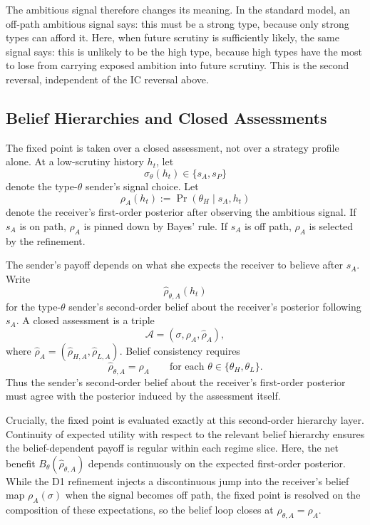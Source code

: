 The ambitious signal therefore changes its meaning. In the standard model, an off-path ambitious signal says: this must be a strong type, because only strong types can afford it. Here, when future scrutiny is sufficiently likely, the same signal says: this is unlikely to be the high type, because high types have the most to lose from carrying exposed ambition into future scrutiny. This is the second reversal, independent of the IC reversal above.

\subsection{Belief Hierarchies and Closed Assessments}
\label{subsec:belief-loop-hierarchy}

The fixed point is taken over a closed assessment, not over a strategy profile alone. At a low-scrutiny history \(h_t\), let
\[
\sigma_\theta(h_t)\in\{s_A,s_P\}
\]
denote the type-\(\theta\) sender's signal choice. Let
\[
\rho_A(h_t):=\Pr(\theta_H\mid s_A,h_t)
\]
denote the receiver's first-order posterior after observing the ambitious signal. If \(s_A\) is on path, \(\rho_A\) is pinned down by Bayes' rule. If \(s_A\) is off path, \(\rho_A\) is selected by the refinement.

The sender's payoff depends on what she expects the receiver to believe after \(s_A\). Write
\[
\widehat \rho_{\theta,A}(h_t)
\]
for the type-\(\theta\) sender's second-order belief about the receiver's posterior following \(s_A\). A closed assessment is a triple
\[
\mathcal A=(\sigma,\rho_A,\widehat \rho_A),
\]
where \(\widehat \rho_A=(\widehat\rho_{H,A},\widehat\rho_{L,A})\). Belief consistency requires
\[
\widehat\rho_{\theta,A}=\rho_A
\qquad\text{for each }\theta\in\{\theta_H,\theta_L\}.
\]
Thus the sender's second-order belief about the receiver's first-order posterior must agree with the posterior induced by the assessment itself.

Crucially, the fixed point is evaluated exactly at this second-order hierarchy layer. Continuity of expected utility with respect to the relevant belief hierarchy ensures the belief-dependent payoff is regular within each regime slice. Here, the net benefit \(B_\theta(\widehat{\rho}_{\theta,A})\) depends continuously on the expected first-order posterior. While the D1 refinement injects a discontinuous jump into the receiver's belief map \(\rho_A(\sigma)\) when the signal becomes off path, the fixed point is resolved on the composition of these expectations, so the belief loop closes at \(\widehat\rho_{\theta,A}=\rho_A\).

